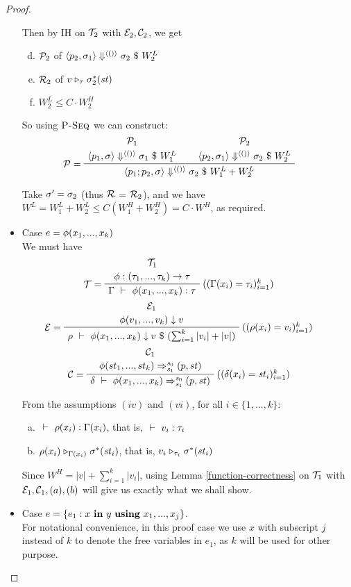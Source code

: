 \begin{proof}
\begin{itemize}
Then by IH on  $\mathcal{T}_2$ with $\mathcal{E}_2,\mathcal{C}_2$, we get 
\begin{enumerate}	[(a)]
	\setcounter{enumi}{3}
	\item $\mathcal{P}_2$ of $\left\langle p_2,\sigma_1 \right\rangle \Downarrow^{\langle () \rangle} \sigma_2 \ \$ \ W^L_2$ 
	\item $\mathcal{R}_2$ of $ v \mathrel{\triangleright_{\tau}} \sigma_2^*(\mathit{st})$
    \item $W^L_2 \le C \cdot W^H_2 $
\end{enumerate}

So using $\textsc{P-Seq}$ we can construct:  
$$\PT{
	\UCN{\MP_1}{\seval{p_1}{\sgm}{\vunit}{\sgm_1}{W^L_1}}
	\UCN{\MP_2}{\seval{p_2}{\sgm_1}{\vunit}{\sgm_2}{W^L_2}}
	\LeLa{\MP = }	
	\BC{\seval{p_1;p_2}{\sgm}{\vunit}{\sgm_2}{W^L_1+W^L_2}}
}$$


Take $\sigma' = \sigma_2$ (thus $\mathcal{R}$ = $\mathcal{R}_2$),  and we have $W^L=W^L_1+W^L_2 \le C(W^H_1+W^H_2) = C \cdot W^H$, as required.



\item Case $e = \phi(x_1,...,x_k)$ \\
We must have  
$$\PT{
	\UCN{\MT_1}{\Typef {\hcall} {\replc{k}{\tau}} {\tau}}
	\LeLa{\MT = }
	\RiLa{((\Gam(x_i)= \tau_i)^k_{i=1})}
	\UC{\Type{\Gam}{\hcall{\Tupk{x}}}{\tau}}
}$$
$$\PT{
	\UCN{\ME_1}{\EvalF{\hcall}{v_1,...,v_k}{v}}
	\LeLa{\ME = }
	\RiLa{((\rho(x_i)=v_i)^k_{i=1})}
	\UC{\Eval{\rho}{\hcall{\Tupk{x}}}{v}{(\sum_{i=1}^{k}|v_i| +|v| )}}
}$$
$$\PT{
	\UCN{\MC_1}{\Transf{\hcall}{\replc{k}{st}}{\s_0}{\s_1}{\sfun{p}{\st}}}
	\LeLa{\MC =}
	\RiLa{((\del(x_i)=\st_i)^k_{i=1})}
	\UC{\Trans{\del}{\hcall \Tupk{x}}{\s_0}{\s_1}{\sfun{p}{\st}}}
}$$

From the assumptions $(iv)$ and $(vi)$, for all $i \in \{1,...,k\}$:
\begin{enumerate}[(a)]
	\item $\ \vdash\  \rho(x_i) : \Gamma(x_i)$, that is, $\ \vdash\  v_i : \tau_i$
	\item $\rho(x_i) \mathrel{\triangleright_{\Gamma(x_i)}} \sigma^*(\mathit{st}_i)$, that is,
	$v_i \mathrel{\triangleright_{\tau_i}} \sigma^*(\mathit{st}_i)$
\end{enumerate}

Since $W^H = |v| + \sum_{i=1}^{k}|v_i| $, 
using Lemma \ref{function-correctness} on $\mathcal{T}_1$  with $\mathcal{E}_1, \mathcal{C}_1, (a),(b)$ will give us exactly what we shall show.

		
\item Case $e = \{e_1 : x \ \mathbf{in} \ y \ \mathbf{using} \ x_1,...,x_j\}$. \\
\def\eqnum#1{eq-mainproof-#1}  
\def\lunit{\vrange{()_1}{()_l}} 
\def\stwo{\< \F_1,..., \F_l, \T \'>}
\def\sgmszs{\sgm[\s_0 \|-> \lunit, \st_2 \>-> \sgm''(\st_2)]}
\def\sgmsz{\sgm[\s_0 \|-> \lunit]}
For notational convenience, in this proof case we use $x$ with subscript $j$ instead of $k$ to denote the free variables in $e_1$, as $k$ will be used for other purpose. 


\end{itemize}
\end{proof}
